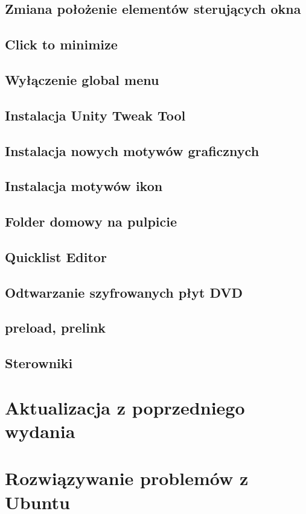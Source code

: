 \documentclass[a4paper,11pt,oneside]{mwart}
\begin{document}
        \subsection{Zmiana położenie elementów sterujących okna}
        \subsection{Click to minimize}
        \subsection{Wyłączenie global menu}
        \subsection{Instalacja Unity Tweak Tool}
        \subsection{Instalacja nowych motywów graficznych}
        \subsection{Instalacja motywów ikon}
        \subsection{Folder domowy na pulpicie}
        \subsection{Quicklist Editor}
        \subsection{Odtwarzanie szyfrowanych płyt DVD}
        \subsection{preload, prelink}
        \subsection{Sterowniki}
        \label{sterowniki}
\section{Aktualizacja z poprzedniego wydania}
\section{Rozwiązywanie problemów z Ubuntu}
\end{document}
